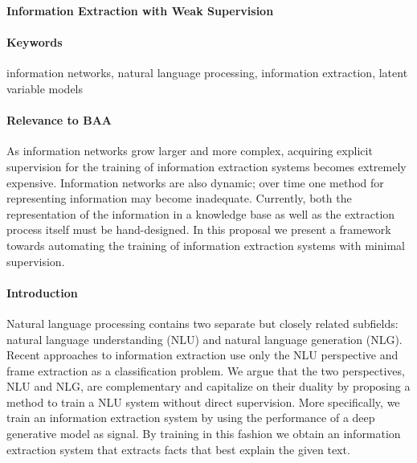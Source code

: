 \documentclass[11pt]{article}
\begin{document}

\begin{center}
\textbf{Information Extraction with Weak Supervision}
\end{center}

\begin{comment}
Spectrum from hard attention => hard segmental => HSMM for generative model, coverage / recall
Should we go into HSMM??? or is hard segmental attention enough

composition function = categorical over two entries of x

structured attention for IE posterior?
\end{comment}

\paragraph{Keywords}
information networks, natural language processing, information extraction,
latent variable models

\paragraph{Relevance to BAA}
As information networks grow larger and more complex,
acquiring explicit supervision for the training of information extraction systems
becomes extremely expensive.
Information networks are also dynamic;
over time one method for representing information may become inadequate.
Currently, both the representation of the information in a knowledge base
as well as the extraction process itself must be hand-designed.
In this proposal we present a framework towards automating the
training of information extraction systems with minimal supervision.

\paragraph{Introduction}
Natural language processing contains two separate but
closely related subfields: natural language understanding (NLU) and natural language
generation (NLG).
Recent approaches to information extraction use only the NLU perspective
and frame extraction as a classification problem.
We argue that the two perspectives, NLU and NLG, are complementary
and capitalize on their duality by proposing a method to train a NLU system
without direct supervision.
More specifically, we train an information extraction system by using
the performance of a deep generative model as signal.
By training in this fashion we obtain an information extraction system
that extracts facts that best explain the given text.
\end{document}
